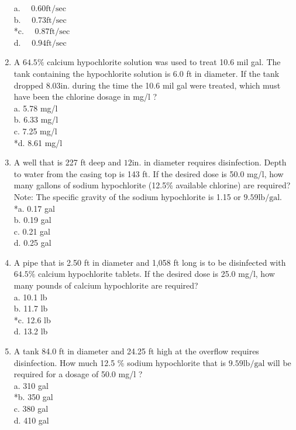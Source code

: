 \begin{enumerate}
a. $\quad 0.60 \mathrm{ft} / \mathrm{sec}$\\
b. $\quad 0.73 \mathrm{ft} / \mathrm{sec}$\\
*c. $\quad 0.87 \mathrm{ft} / \mathrm{sec}$\\
d. $\quad 0.94 \mathrm{ft} / \mathrm{sec}$\\
\item A $64.5 \%$ calcium hypochlorite solution was used to treat 10.6 mil gal. The tank containing the hypochlorite solution is 6.0 ft in diameter. If the tank dropped $8.03 \mathrm{in}$. during the time the 10.6 mil gal were treated, which must have been the chlorine dosage in mg/l ?\\
a. 5.78 mg/l\\
b. 6.33 mg/l\\
c. 7.25 mg/l\\
*d. 8.61 mg/l\\
\item A well that is 227 ft deep and $12 \mathrm{in}$. in diameter requires disinfection. Depth to water from the casing top is 143 ft. If the desired dose is 50.0 mg/l, how many gallons of sodium hypochlorite (12.5\% available chlorine) are required? Note: The specific gravity of the sodium hypochlorite is 1.15 or $9.59 \mathrm{lb} / \mathrm{gal}$.\\
*a. 0.17 gal\\
b. 0.19 gal\\
c. 0.21 gal\\
d. 0.25 gal \\
\item A pipe that is 2.50 ft in diameter and 1,058 ft long is to be disinfected with $64.5 \%$ calcium hypochlorite tablets. If the desired dose is 25.0 mg/l, how many pounds of calcium hypochlorite are required?\\
a. 10.1 lb\\
b. 11.7 lb\\
*c. 12.6 lb\\
d. 13.2 lb\\
\item A tank 84.0 ft in diameter and 24.25 ft high at the overflow requires disinfection. How much 12.5 \% sodium hypochlorite that is $9.59 \mathrm{lb} / \mathrm{gal}$ will be required for a dosage of 50.0 mg/l ?\\
a. 310 gal\\
*b. 350 gal\\
c. 380 gal\\
d. 410 gal\\

\end{enumerate}
